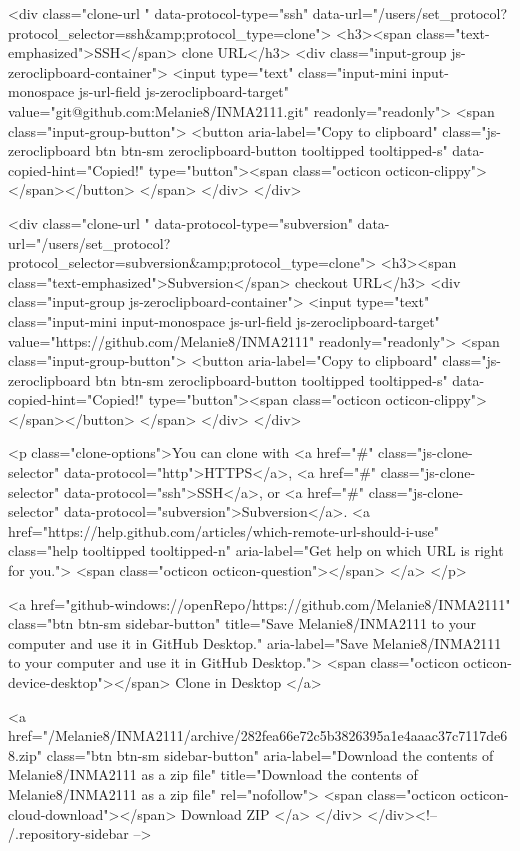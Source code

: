  
<div class="clone-url "
  data-protocol-type="ssh"
  data-url="/users/set_protocol?protocol_selector=ssh&amp;protocol_type=clone">
  <h3><span class="text-emphasized">SSH</span> clone URL</h3>
  <div class="input-group js-zeroclipboard-container">
    <input type="text" class="input-mini input-monospace js-url-field js-zeroclipboard-target"
           value="git@github.com:Melanie8/INMA2111.git" readonly="readonly">
    <span class="input-group-button">
      <button aria-label="Copy to clipboard" class="js-zeroclipboard btn btn-sm zeroclipboard-button tooltipped tooltipped-s" data-copied-hint="Copied!" type="button"><span class="octicon octicon-clippy"></span></button>
    </span>
  </div>
</div>

  
<div class="clone-url "
  data-protocol-type="subversion"
  data-url="/users/set_protocol?protocol_selector=subversion&amp;protocol_type=clone">
  <h3><span class="text-emphasized">Subversion</span> checkout URL</h3>
  <div class="input-group js-zeroclipboard-container">
    <input type="text" class="input-mini input-monospace js-url-field js-zeroclipboard-target"
           value="https://github.com/Melanie8/INMA2111" readonly="readonly">
    <span class="input-group-button">
      <button aria-label="Copy to clipboard" class="js-zeroclipboard btn btn-sm zeroclipboard-button tooltipped tooltipped-s" data-copied-hint="Copied!" type="button"><span class="octicon octicon-clippy"></span></button>
    </span>
  </div>
</div>



<p class="clone-options">You can clone with
  <a href="#" class="js-clone-selector" data-protocol="http">HTTPS</a>, <a href="#" class="js-clone-selector" data-protocol="ssh">SSH</a>, or <a href="#" class="js-clone-selector" data-protocol="subversion">Subversion</a>.
  <a href="https://help.github.com/articles/which-remote-url-should-i-use" class="help tooltipped tooltipped-n" aria-label="Get help on which URL is right for you.">
    <span class="octicon octicon-question"></span>
  </a>
</p>


  <a href="github-windows://openRepo/https://github.com/Melanie8/INMA2111" class="btn btn-sm sidebar-button" title="Save Melanie8/INMA2111 to your computer and use it in GitHub Desktop." aria-label="Save Melanie8/INMA2111 to your computer and use it in GitHub Desktop.">
    <span class="octicon octicon-device-desktop"></span>
    Clone in Desktop
  </a>


                <a href="/Melanie8/INMA2111/archive/282fea66e72c5b3826395a1e4aaac37c7117de68.zip"
                   class="btn btn-sm sidebar-button"
                   aria-label="Download the contents of Melanie8/INMA2111 as a zip file"
                   title="Download the contents of Melanie8/INMA2111 as a zip file"
                   rel="nofollow">
                  <span class="octicon octicon-cloud-download"></span>
                  Download ZIP
                </a>
              </div>
        </div><!-- /.repository-sidebar -->

